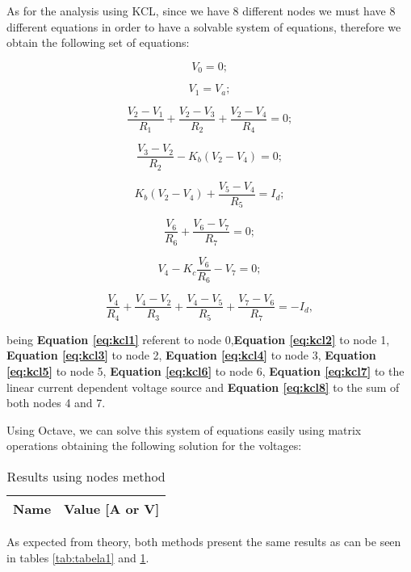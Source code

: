 As for the analysis using KCL, since we have 8 different nodes we must have 8 different equations
in order to have a solvable system of equations, therefore we obtain the following set of equations:

\begin{equation}
  V_0 = 0;
  \label{eq:kcl1}
\end{equation}

\begin{equation}
  V_1 = V_a;
  \label{eq:kcl2}
\end{equation}

\begin{equation}
  \frac{V_2 - V_1}{R_1} + \frac{V_2 - V_3}{R_2} + \frac{V_2 - V_4}{R_4}= 0;
  \label{eq:kcl3}
\end{equation}

\begin{equation}
  \frac{V_3 - V_2}{R_2} - K_b(V_2 - V_4) = 0;
  \label{eq:kcl4}
\end{equation}

\begin{equation}
  K_b(V_2 - V_4) + \frac{V_5 - V_4}{R_5} = I_d;
  \label{eq:kcl5}
\end{equation}

\begin{equation}
  \frac{V_6}{R_6} + \frac{V_6 - V_7}{R_7} = 0;
  \label{eq:kcl6}
\end{equation}

\begin{equation}
  V_4 - K_c\frac{V_6}{R_6} - V_7 =0;
  \label{eq:kcl7}
\end{equation}

\begin{equation}
  \frac{V_4}{R_4} + \frac{V_4 - V_2}{R_3} + \frac{V_4 - V_5}{R_5} + \frac{V_7 - V_6}{R_7} = -I_d,
  \label{eq:kcl8}
\end{equation}

being \textbf{Equation \ref{eq:kcl1}} referent to node 0,\textbf{Equation \ref{eq:kcl2}} to node 1, \textbf{Equation \ref{eq:kcl3}} to node 2,
\textbf{Equation \ref{eq:kcl4}} to node 3, \textbf{Equation \ref{eq:kcl5}} to node 5, \textbf{Equation \ref{eq:kcl6}} to node 6, \textbf{Equation \ref{eq:kcl7}}
to the linear current dependent voltage source and \textbf{Equation \ref{eq:kcl8}} to the sum of both nodes 4 and 7.

Using Octave, we can solve this system of equations easily using matrix operations obtaining the following
solution for the voltages:

\begin{table}[h]
  \centering
  \begin{tabular}{|l|r|}
    \hline    
    {\bf Name} & {\bf Value [A or V]} \\ \hline
    
  \end{tabular}
  \caption{Results using nodes method}
  \label{tab:tabela2}
\end{table}

As expected from theory, both methods present the same results as can be seen in tables \ref{tab:tabela1} and \ref{tab:tabela2}.

